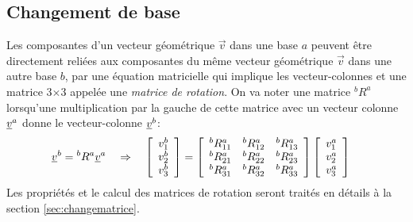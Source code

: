 \subsection{Changement de base}
%
Les composantes d'un vecteur géométrique $\vec{v}$ dans une base $a$ peuvent être directement reliées aux composantes du même vecteur géométrique $\vec{v}$ dans une autre base $b$, par une équation matricielle qui implique les vecteur-colonnes et une matrice 3$\times$3 appelée une \textit{matrice de rotation}. On va noter une matrice $^bR^a$ lorsqu'une multiplication par la gauche de cette matrice avec un vecteur colonne $\underline{v}^a$ donne le vecteur-colonne $\underline{v}^b$:
\begin{align}
 \underline{v}^b &= {}^bR^a \underline{v}^a  \quad \Rightarrow \quad
 \left[ \begin{array}{c} v_1^b \\ v_2^b \\ v_3^b  \end{array} \right]
 =
 \left[ \begin{array}{c c c}
 {}^bR^a_{11} & {}^bR^a_{12} & {}^bR^a_{13} \\
 {}^bR^a_{21} & {}^bR^a_{22} & {}^bR^a_{23} \\
 {}^bR^a_{31} & {}^bR^a_{32} & {}^bR^a_{33}
 \end{array}  \right]
 \left[ \begin{array}{c} v_1^a \\ v_2^a \\ v_3^a  \end{array} \right]
 \label{eq:basechange1}
\end{align}
Les propriétés et le calcul des matrices de rotation seront traités en détails à la section \ref{sec:changematrice}.



